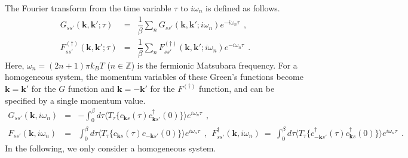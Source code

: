 \documentclass[a4j]{jsarticle}
\begin{document}
The Fourier transform from the time variable $\tau$ to $i \omega_{n}$ is defined as follows.
%
%
%
%
\begin{eqnarray}
	G_{ss'}(\bm{k} , \bm{k}' ; \tau)
	&=&
	\dfrac{1}{\beta} \sum_{n}
	G_{ss'}(\bm{k} , \bm{k}' ; i \omega_{n} )
	e^{- i \omega_{n} \tau }
	\ \ , \nonumber \\[2mm]
	F_{ss'}^{(\dagger)}(\bm{k} , \bm{k}' ; \tau)
	&=&
	\dfrac{1}{\beta} \sum_{n}
	F_{ss'}^{(\dagger)}(\bm{k} , \bm{k}' ; i \omega_{n} )
	e^{- i \omega_{n} \tau }
	\ \ .
\end{eqnarray}
%
%
%
%
Here, $\omega_{n}=(2n+1)\pi k_{B} T$ ($n \in \mathbb{Z}$) is the fermionic Matsubara frequency.
For a homogeneous system, the momentum variables of these Green's functions become $\bm{k}=\bm{k}'$ for the $G$ function and $\bm{k}=-\bm{k}'$ for the $F^{(\dagger)}$ function, and can be specified by a single momentum value.
%
%
%
%
\begin{eqnarray}
	G_{ss'}(\bm{k} , i \omega_{n} )
	&=&
	-
	\int_{0}^{\beta}
	d \tau
	\langle T_{\tau} \{ c_{\bm{k}s}(\tau) c_{\bm{k} s'}^{\dagger}(0) \} \rangle
	e^{i \omega_{n} \tau}
	\ \ ,
	\\[3mm]
	F_{ss'}(\bm{k} , i \omega_{n} )
	&=&
	\int_{0}^{\beta}
	d \tau
	\langle T_{\tau} \{ c_{ \bm{k} s }(\tau) c_{-\bm{k} s' }(0) \} \rangle
	e^{i \omega_{n} \tau}
	\ \ , \ \
	F_{ss'}^{\dagger}(\bm{k} , i \omega_{n} )
	\ = \
	\int_{0}^{\beta}
	d \tau
	\langle T_{\tau} \{ c_{ - \bm{k} s' }^{\dagger}(\tau) c_{ \bm{k} s }^{\dagger}(0) \} \rangle
	e^{i \omega_{n} \tau}
	\ \ .
\end{eqnarray}
%
%
%
%
In the following, we only consider a homogeneous system.
\end{document}
